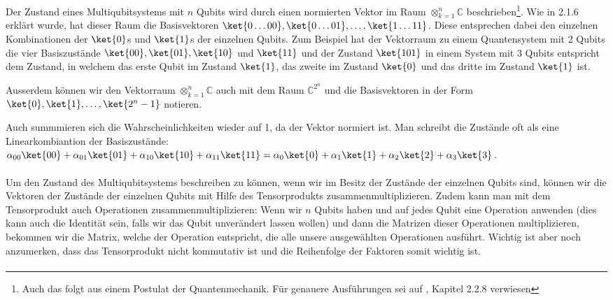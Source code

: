 Der Zustand eines Multiqubitsystems mit $n$ Qubits wird durch einen normierten Vektor im Raum $\otimes_{k = 1}^{n} \mathbb{C}$ beschrieben\footnote{Auch das folgt aus einem Postulat der Quantenmechanik. Für genauere Ausführungen sei auf \cite{QC}, Kapitel 2.2.8 verwiesen}. Wie in 2.1.6 erklärt wurde, hat dieser Raum die Basisvektoren $\ket{0\dots 00}, \ket{0\dots 01}, \dots, \ket{1\dots 11}$. Diese entsprechen dabei den einzelnen Kombinationen der $\ket{0}$s und $\ket{1}$s der einzelnen Qubits. Zum Beispiel hat der Vektorraum zu einem Quantensystem mit 2 Qubits die vier Basiszustände $\ket{00}, \ket{01}, \ket{10}$ und $\ket{11}$ und der Zustand $\ket{101}$ in einem System mit 3 Qubits entspricht dem Zustand, in welchem das erste Qubit im Zustand $\ket{1}$, das zweite im Zustand $\ket{0}$ und das dritte im Zustand $\ket{1}$ ist. 

Ausserdem können wir den Vektorraum $\otimes_{k = 1}^{n} \mathbb{C}$ auch mit dem Raum $\mathbb{C}^{2^n}$ und die Basisvektoren in der Form $\ket{0}, \ket{1}, \dots, \ket{2^n - 1}$ notieren.

Auch summmieren sich die Wahrscheinlichkeiten wieder auf 1, da der Vektor normiert ist. Man schreibt die Zustände oft als eine Linearkombiantion der Basiszustände: $\alpha_{00}\ket{00} + \alpha_{01}\ket{01} + \alpha_{10}\ket{10} + \alpha_{11}\ket{11} = \alpha_{0}\ket{0} + \alpha_{1}\ket{1} + \alpha_{2}\ket{2} + \alpha_{3}\ket{3}$.

\paragraph{}
Um den Zustand des Multiqubitsystems beschreiben zu können, wenn wir im Besitz der Zustände der einzelnen Qubits sind, können wir die Vektoren der Zustände der einzelnen Qubits mit Hilfe des Tensorprodukts zusammenmultiplizieren. Zudem kann man mit dem Tensorprodukt auch Operationen zusammenmultiplizieren: Wenn wir $n$ Qubits haben und auf jedes Qubit eine Operation anwenden (dies kann auch die Identität sein, falls wir das Qubit unverändert lassen wollen) und dann die Matrizen dieser Operationen multiplizieren, bekommen wir die Matrix, welche der Operation entspricht, die alle unsere ausgewählten Operationen ausführt. Wichtig ist aber noch anzumerken, dass das Tensorprodukt nicht kommutativ ist und die Reihenfolge der Faktoren somit wichtig ist.
\paragraph{}

